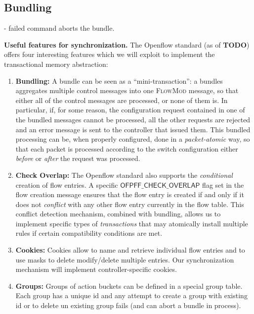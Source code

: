 \documentclass[conference]{sigcomm-alternate}
\begin{document}
\subsection{Bundling}
- failed command aborts the bundle.

\textbf{Useful features for synchronization.} The Openflow standard (as of \textbf{TODO}) offers four interesting
features which we will exploit to implement the transactional memory abstraction:

\begin{enumerate}
\item \textbf{Bundling:}
A bundle can be seen as a ``mini-transaction'':
a bundles aggregates multiple control messages
into one \textsc{FlowMod} message, so that either all of the control messages are
processed, or none of them is. In particular, if, for some reason, the
configuration request contained in one of the bundled messages cannot
be processed, all the other requests  are rejected and an error
message is sent to the controller that issued them.
This bundled processing can be, when properly configured, done in a
\emph{packet-atomic} way, so that each packet is processed according
to the switch configuration either \emph{before} or \emph{after} the
request was processed.

\item \textbf{Check Overlap:}
The Openflow standard also supports the \emph{conditional} creation of
flow entries. A specific $\textsf{OFPFF\_CHECK\_OVERLAP}$ flag
set in the flow creation message ensures
that the flow entry is created if and only if it does not \emph{conflict}
with any other flow entry currently in the flow table.
This  conflict detection mechanism, combined with bundling,
allows us to implement specific types of \emph{transactions} that may
atomically install multiple rules if certain compatibility conditions
are met.

\item \textbf{Cookies:} Cookies allow to name and retrieve individual
flow entries and to use masks to delete modify/delete multiple entries. Our synchronization mechanism will implement controller-specific cookies.

\item \textbf{Groups:} Groups of action buckets can be defined in a special group table. Each group has a unique id and any attempt to create a group with existing id or to delete un existing group fails (and can abort a bundle in process).
\end{enumerate}
\end{document}
